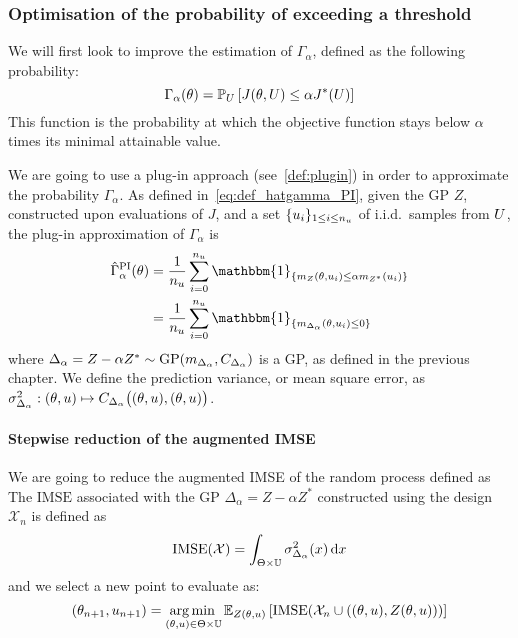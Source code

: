 \documentclass[../../Main_ManuscritThese.tex]{subfiles}
\begin{document}
\subsubsection{Optimisation of the probability of exceeding a threshold}

We will first look to improve the estimation of $\Gamma_{\alpha}$,
defined as the following probability:
\begin{equation}
  \Gamma_{\alpha}(\theta) = \mathbb{P}_{U}\left[J(\theta,U) \leq \alpha J^*(U)\right]
\end{equation}
This function is the probability at which the objective function stays
below $\alpha$ times its minimal attainable value.

We are going to use a plug-in approach (see~\cref{def:plugin}) in
order to approximate the probability $\Gamma_{\alpha}$. As defined
in~\cref{eq:def_hatgamma_PI}, given the GP $Z$, constructed upon
evaluations of $J$, and a set $\{u_i\}_{1\leq i\leq n_{u}}$ of
i.i.d.\ samples from $U$, the plug-in approximation of
$\Gamma_{\alpha}$ is
\begin{align}
  \hat{\Gamma}^{\mathrm{PI}}_{\alpha}(\kk) &= \frac{1}{n_\uu}\sum_{i=0}^{n_{\uu}} \mathbbm{1}_{\{m_Z(\kk, \uu_i) \leq \alpha m_{Z^*}(\uu_i)\}} \\
                                           &= \frac{1}{n_\uu}\sum_{i=0}^{n_{\uu}} \mathbbm{1}_{\{m_{\Delta_{\alpha}}(\kk,\uu_i) \leq 0\}}
\end{align}
where
$\Delta_{\alpha} = Z - \alpha Z^* \sim \operatorname{\mathrm{GP}}(m_{\Delta_{\alpha}},
C_{\Delta_\alpha})$ is a GP, as defined in the previous chapter. We
define the prediction variance, or mean square error, as
$\sigma^2_{\Delta_{\alpha}}: (\theta, u) \mapsto
C_{\Delta_{\alpha}}\big((\theta, u), (\theta, u) \big)$.

\paragraph{Stepwise reduction of the augmented IMSE}
We are going to reduce the augmented IMSE of the random process
defined as The $\mathrm{IMSE}$ associated with the GP
$\Delta_{\alpha}=Z-\alpha Z^*$ constructed using the design
$\mathcal{X}_n$ is defined as
\begin{equation}
  \operatorname{\mathrm{IMSE}}(\mathcal{X}) = \int_{\Theta \times \mathbb{U}} \sigma^2_{\Delta_{\alpha}}(x) \,\mathrm{d}x
\end{equation}
and we select a new point to evaluate as:
\begin{equation}
  (\theta_{n+1}, u_{n+1}) = \operatorname*{arg\,min \,}_{(\theta,u)\in\Theta\times \mathbb{U}} \mathbb{E}_{Z(\theta, u)}\left[\operatorname{\mathrm{IMSE}}(\mathcal{X}_n \cup \left((\theta, u), Z(\theta, u)\right))\right]
\end{equation}
\end{document}
